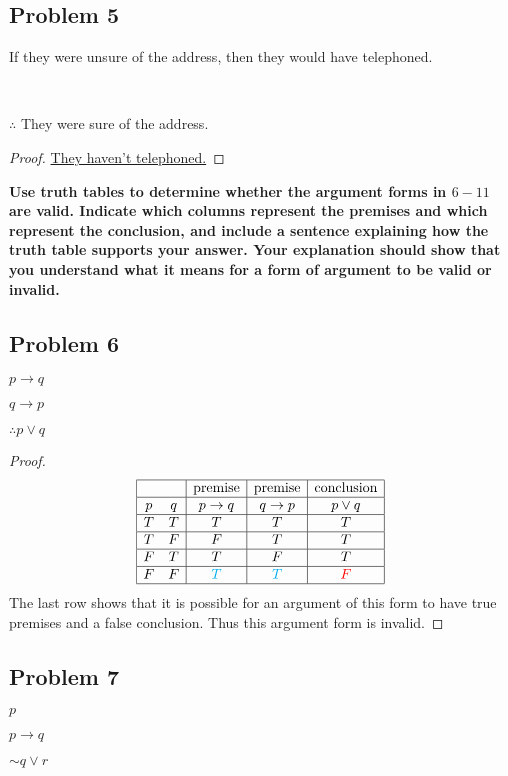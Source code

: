 \documentclass[14pt]{extarticle}
\newcommand{\fbl}{\underline{\hspace{1cm}}\,\,}
\begin{document}
\subsection{Problem 5}
If they were unsure of the address, then they would have telephoned.

\fbl

$\therefore$ They were sure of the address.

\begin{proof}
\underline{They haven't telephoned.}
\end{proof}

{\bf \color{cyan} Use truth tables to determine whether the argument forms in
$6-11$ are valid. Indicate which columns represent the premises and which
represent the conclusion, and include a sentence explaining how the truth table
supports your
answer. Your explanation should show that you understand what it means for a
form of argument to be valid or invalid.}

\subsection{Problem 6}
$p \to q$

$q \to p$

$\therefore p \vee q$

\begin{proof}
$$
\begin{array}{|cc|c|c|c|}
\hline
& & \text{premise} & \text{premise} & \text{conclusion} \\
\hline
p & q & p \to q & q \to p & p \vee q \\
\hline
T & T & T & T & T \\
\hline
T & F & F & T & T \\
\hline
F & T & T & F & T \\
\hline
F & F & \color{cyan} T & \color{cyan} T & \color{red} F \\
\hline
\end{array}
$$
The last row shows that it is possible for an argument of this form to have true
premises and a false conclusion. Thus this argument form is invalid.
\end{proof}

\subsection{Problem 7}
$p$

$p \to q$

${\sim q} \vee r$
\end{document}

